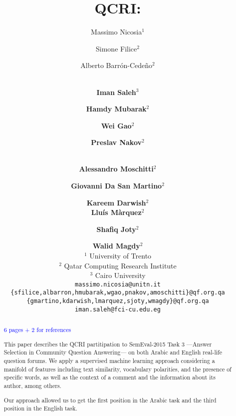 \documentclass[11pt,letterpaper]{article}
\title{QCRI:
}
\author{%
Massimo Nicosia$^1$ \and Simone Filice$^2$ \and Alberto Barr\'on-Cede\~no$^2$ 
\and \\
{\bf Iman Saleh}$^3$  \and {\bf Hamdy Mubarak}$^2$ \and {\bf Wei Gao$^2$} \and 
{\bf Preslav Nakov$^2$}
\and \\
{\bf Alessandro Moschitti$^2$} \and {\bf Giovanni Da San Martino}$^2$	
\and  {\bf Kareem Darwish$^2$} \\ 
{\bf Llu\'is M\`arquez$^2$}  \and  
{\bf Shafiq Joty$^2$} \and {\bf Walid Magdy$^2$} \\
$^1$ University of Trento \\
$^2$ Qatar Computing Research Institute	\\
$^3$ Cairo University \\
{\tt massimo.nicosia@unitn.it}	\\
{\tt \{sfilice,albarron,hmubarak,wgao,pnakov,amoschitti\}@qf.org.qa} 	\\
{\tt \{gmartino,kdarwish,lmarquez,sjoty,wmagdy\}@qf.org.qa}	
\\
{\tt iman.saleh@fci-cu.edu.eg} 
% 
% 
% 
% 
% 
}
\date{}
\newcommand{\blue}{\textcolor{blue}}
\begin{document}
\maketitle
\begin{abstract}

\blue{6 pages + 2 for references}

This paper describes the QCRI partitipation to SemEval-2015 Task 3 ---Answer 
Selection in Community Question Answering--- on both Arabic and English 
real-life question forums. We apply a supervised machine learning approach 
considering a manifold of features including text similarity, vocabulary 
polarities, and the presence of specific words, as well as the context of a 
comment and the information about its author, among others.

Our approach allowed us to get the first position in the Arabic task and the 
third position in the English task.
\end{abstract}

















% 
% 
% 
% 

\end{document}
